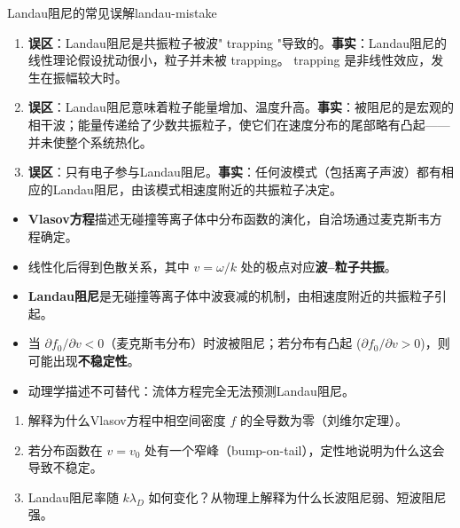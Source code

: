 \documentclass[12pt,a4paper,openany,oneside]{book}
\begin{document}
\begin{warning}{Landau阻尼的常见误解}{landau-mistake}
\begin{enumerate}
\item \textbf{误区}：Landau阻尼是共振粒子被波" trapping "导致的。\textbf{事实}：Landau阻尼的线性理论假设扰动很小，粒子并未被 trapping。 trapping 是非线性效应，发生在振幅较大时。
\item \textbf{误区}：Landau阻尼意味着粒子能量增加、温度升高。\textbf{事实}：被阻尼的是宏观的相干波；能量传递给了少数共振粒子，使它们在速度分布的尾部略有凸起——并未使整个系统热化。
\item \textbf{误区}：只有电子参与Landau阻尼。\textbf{事实}：任何波模式（包括离子声波）都有相应的Landau阻尼，由该模式相速度附近的共振粒子决定。
\end{enumerate}
\end{warning}

\begin{chapterreview}
\begin{itemize}
\item \textbf{Vlasov方程}描述无碰撞等离子体中分布函数的演化，自洽场通过麦克斯韦方程确定。
\item 线性化后得到色散关系，其中 $v = \omega/k$ 处的极点对应\textbf{波--粒子共振}。
\item \textbf{Landau阻尼}是无碰撞等离子体中波衰减的机制，由相速度附近的共振粒子引起。
\item 当 $\partial f_0/\partial v < 0$（麦克斯韦分布）时波被阻尼；若分布有凸起 ($\partial f_0/\partial v > 0$)，则可能出现\textbf{不稳定性}。
\item 动理学描述不可替代：流体方程完全无法预测Landau阻尼。
\end{itemize}
\end{chapterreview}

\begin{miniquiz}
\begin{enumerate}
\item 解释为什么Vlasov方程中相空间密度 $f$ 的全导数为零（刘维尔定理）。
\item 若分布函数在 $v=v_0$ 处有一个窄峰（bump-on-tail），定性地说明为什么这会导致不稳定。
\item Landau阻尼率随 $k\lambda_D$ 如何变化？从物理上解释为什么长波阻尼弱、短波阻尼强。
\end{enumerate}
\end{miniquiz}





\end{document}
